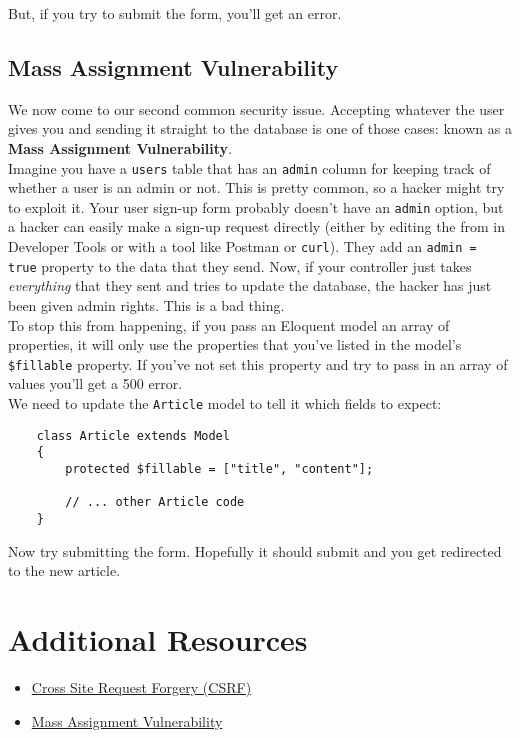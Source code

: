 But, if you try to submit the form, you'll get an error.


\subsection{Mass Assignment Vulnerability}

We now come to our second common security issue. Accepting whatever the user gives you and sending it straight to the database is one of those cases: known as a \textbf{Mass Assignment Vulnerability}.
\\

Imagine you have a \texttt{users} table that has an \texttt{admin} column for keeping track of whether a user is an admin or not. This is pretty common, so a hacker might try to exploit it. Your user sign-up form probably doesn't have an \texttt{admin} option, but a hacker can easily make a sign-up request directly (either by editing the from in Developer Tools or with a tool like Postman or \texttt{curl}). They add an \texttt{admin = true} property to the data that they send. Now, if your controller just takes \textit{everything} that they sent and tries to update the database, the hacker has just been given admin rights. This is a bad thing.
\\

To stop this from happening, if you pass an Eloquent model an array of properties, it will only use the properties that you've listed in the model's \texttt{\$fillable} property. If you've not set this property and try to pass in an array of values you'll get a 500 error.
\\

We need to update the \texttt{Article} model to tell it which fields to expect:

\begin{verbatim}
    class Article extends Model
    {
        protected $fillable = ["title", "content"];

        // ... other Article code
    }
\end{verbatim}

Now try submitting the form. Hopefully it should submit and you get redirected to the new article.




\section{Additional Resources}

\begin{itemize}[leftmargin=*]
    \item \href{https://owasp.org/www-community/attacks/csrf}{Cross Site Request Forgery (CSRF)}
    \item \href{https://cheatsheetseries.owasp.org/cheatsheets/Mass_Assignment_Cheat_Sheet.html}{Mass Assignment Vulnerability}
\end{itemize}
